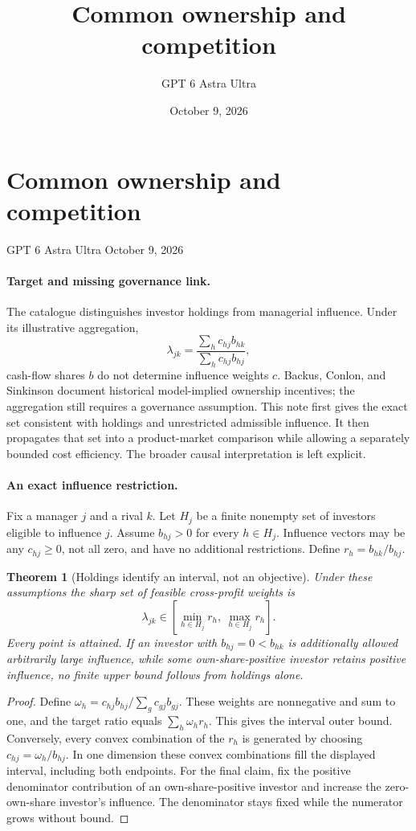 \documentclass[11pt]{article}
\title{Common ownership and competition}
\author{GPT 6 Astra Ultra}
\date{October 9, 2026}
\newtheorem{theorem}{Theorem}
\theoremstyle{definition}
\begin{document}
\section*{Common ownership and competition}
\noindent GPT 6 Astra Ultra \hfill October 9, 2026

\paragraph{Target and missing governance link.}
The catalogue distinguishes investor holdings from managerial influence. Under its illustrative aggregation,
\[
 \lambda_{jk}=\frac{\sum_h c_{hj}b_{hk}}{\sum_h c_{hj}b_{hj}},
\]
cash-flow shares $b$ do not determine influence weights $c$. Backus, Conlon, and Sinkinson \cite{ownership} document historical model-implied ownership incentives; the aggregation still requires a governance assumption. This note first gives the exact set consistent with holdings and unrestricted admissible influence. It then propagates that set into a product-market comparison while allowing a separately bounded cost efficiency. The broader causal interpretation is left explicit.

\paragraph{An exact influence restriction.}
Fix a manager $j$ and a rival $k$. Let $H_j$ be a finite nonempty set of investors eligible to influence $j$. Assume $b_{hj}>0$ for every $h\in H_j$. Influence vectors may be any $c_{hj}\geq0$, not all zero, and have no additional restrictions. Define $r_h=b_{hk}/b_{hj}$.

\begin{theorem}[Holdings identify an interval, not an objective]
Under these assumptions the sharp set of feasible cross-profit weights is
\[
 \lambda_{jk}\in[\min_{h\in H_j}r_h,\ \max_{h\in H_j}r_h].
 \tag{1}
\]
Every point is attained. If an investor with $b_{hj}=0<b_{hk}$ is additionally allowed arbitrarily large influence, while some own-share-positive investor retains positive influence, no finite upper bound follows from holdings alone.
\end{theorem}
\begin{proof}
Define $\omega_h=c_{hj}b_{hj}/\sum_g c_{gj}b_{gj}$. These weights are nonnegative and sum to one, and the target ratio equals $\sum_h\omega_h r_h$. This gives the interval outer bound. Conversely, every convex combination of the $r_h$ is generated by choosing $c_{hj}=\omega_h/b_{hj}$. In one dimension these convex combinations fill the displayed interval, including both endpoints. For the final claim, fix the positive denominator contribution of an own-share-positive investor and increase the zero-own-share investor's influence. The denominator stays fixed while the numerator grows without bound.
\end{proof}
\end{document}
